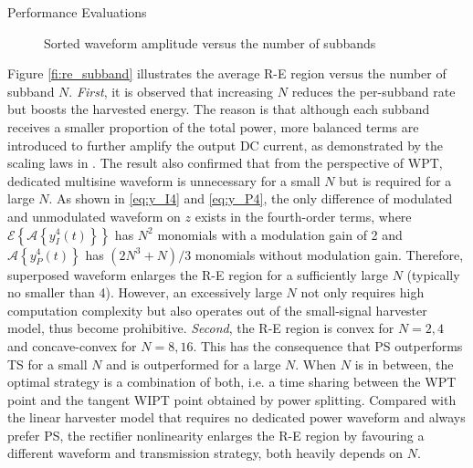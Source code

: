 \documentclass{IEEEtran}
\begin{document}
\begin{section}{Performance Evaluations}
	\begin{figure}
		\centering
		\begin{adjustbox}{width=\linewidth}
			
		\end{adjustbox}
		\caption{Sorted waveform amplitude versus the number of subbands}
		\label{fi:waveform_subband}
	\end{figure}

	Figure \ref{fi:re_subband} illustrates the average R-E region versus the number of subband $N$. \textit{First}, it is observed that increasing $N$ reduces the per-subband rate but boosts the harvested energy. The reason is that although each subband receives a smaller proportion of the total power, more balanced terms are introduced to further amplify the output DC current, as demonstrated by the scaling laws in \cite{Clerckx2018b}. The result also confirmed that from the perspective of WPT, dedicated multisine waveform is unnecessary for a small $N$ but is required for a large $N$. As shown in \ref{eq:y_I4} and \ref{eq:y_P4}, the only difference of modulated and unmodulated waveform on $z$ exists in the fourth-order terms, where $\mathcal{E}\left\{\mathcal{A}\left\{y_{I}^4(t)\right\}\right\}$ has $N^2$ monomials with a modulation gain of 2 and $\mathcal{A}\left\{y_{P}^4(t)\right\}$ has $(2N^3+N)/3$ monomials without modulation gain. Therefore, superposed waveform enlarges the R-E region for a sufficiently large $N$ (typically no smaller than 4). However, an excessively large $N$ not only requires high computation complexity but also operates out of the small-signal harvester model, thus become prohibitive. \textit{Second}, the R-E region is convex for $N = 2, 4$ and concave-convex for $N = 8, 16$. This has the consequence that PS outperforms TS for a small $N$ and is outperformed for a large $N$. When $N$ is in between, the optimal strategy is a combination of both, i.e. a time sharing between the WPT point and the tangent WIPT point obtained by power splitting. Compared with the linear harvester model that requires no dedicated power waveform and always prefer PS, the rectifier nonlinearity enlarges the R-E region by favouring a different waveform and transmission strategy, both heavily depends on $N$.
\end{section}



\end{document}
